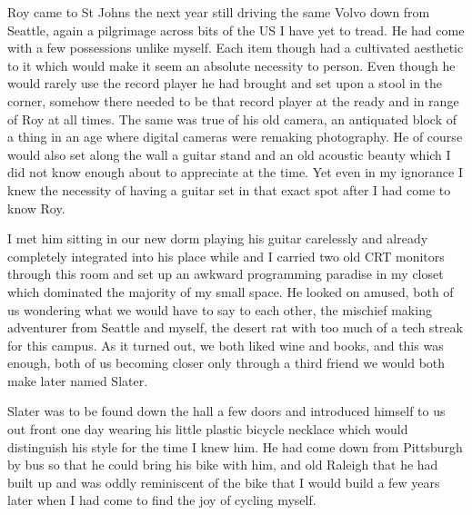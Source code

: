 \documentclass[ebook, 10pt, openright, onecolumn]{memoir}
\begin{document}
Roy came to St Johns the next year still driving the same Volvo down from
Seattle, again a pilgrimage across bits of the US I have yet to tread.  He had
come with a few possessions unlike myself.  Each item though had a cultivated
aesthetic to it which would make it seem an absolute necessity to person.  Even
though he would rarely use the record player he had brought and set upon a stool
in the corner, somehow there needed to be that record player at the ready and in
range of Roy at all times.  The same was true of his old camera, an antiquated
block of a thing in an age where digital cameras were remaking photography. He
of course would also set along the wall a guitar stand and an old acoustic
beauty which I did not know enough about to appreciate at the time.  Yet even in
my ignorance I knew the necessity of having a guitar set in that exact spot
after I had come to know Roy. 

I met him sitting in our new dorm playing his guitar carelessly and already
completely integrated into his place while and I carried two old CRT monitors
through this room and set up an awkward programming paradise in my closet which
dominated the majority of my small space.  He looked on amused, both of us
wondering what we would have to say to each other, the mischief making
adventurer from Seattle and myself, the desert rat with too much of a tech
streak for this campus.  As it turned out, we both liked wine and books, and
this was enough, both of us becoming closer only through a third friend we would
both make later named Slater.

Slater was to be found down the hall a few doors and introduced himself to us
out front one day wearing his little plastic bicycle necklace which would
distinguish his style for the time I knew him.  He had come down from Pittsburgh
by bus so that he could bring his bike with him, and old Raleigh that he had
built up and was oddly reminiscent of the bike that I would build a few years
later when I had come to find the joy of cycling myself.
\end{document}
